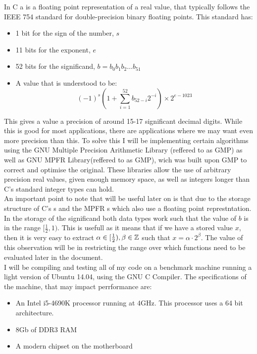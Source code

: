 In C a  is a floating point representation of a real value, that typically follows the IEEE 754 standard for double-precision binary floating points. This standard has:
\begin{itemize}
\item 1 bit for the sign of the number, \(s\)
\item 11 bits for the exponent, \(e\)
\item 52 bits for the significand, \(b = b_0b_1b_2\dots b_{51}\)
\item A value that is understood to be:
	\[(-1)^s\left(1 + \sum_{i=1}^{52}b_{52-i}2^{-i}\right) \times 2^{e-1023
}\]
\end{itemize}

This gives a  value a precision of around 15-17 significant decimal digits. While this is good for most applications, there are applications where we may want even more precision than this. To solve this I will be implementing certain algorithms using the GNU Multiple Precision Arithmetic Library (reffered to as GMP) as well as GNU MPFR Library(reffered to as GMP), wich was built upon GMP to correct and optimise the original. These libraries allow the use of arbitrary precision real values, given enough memory space, as well as integers longer than C's standard integer types can hold.\\

An important point to note that will be useful later on is that due to the storage structure of C's s and the MPFR s which also use a floating point represtntation. In the storage of the significand both data types work such that the value of \(b\) is in the range \([\frac{1}{2}, 1)\). This is usefull as it means that if we have a stored value \(x\), then it is very easy to extract \(\alpha\in[\frac{1}{2}), \beta \in \mathbb{Z}\) such that \(x = \alpha\cdot2^\beta\). The value of this observation will be in restricting the range over which functions need to be evaluated later in the document.\\

I will be compiling and testing all of my code on a benchmark machine running a light version of Ubuntu 14.04, using the GNU C Compiler. The specifications of the machine, that may impact perrformance are:
\begin{itemize}
\item An Intel i5-4690K processor running at 4GHz. This processor uses a 64 bit architecture.
\item 8Gb of DDR3 RAM
\item A modern chipset on the motherboard
\end{itemize}
